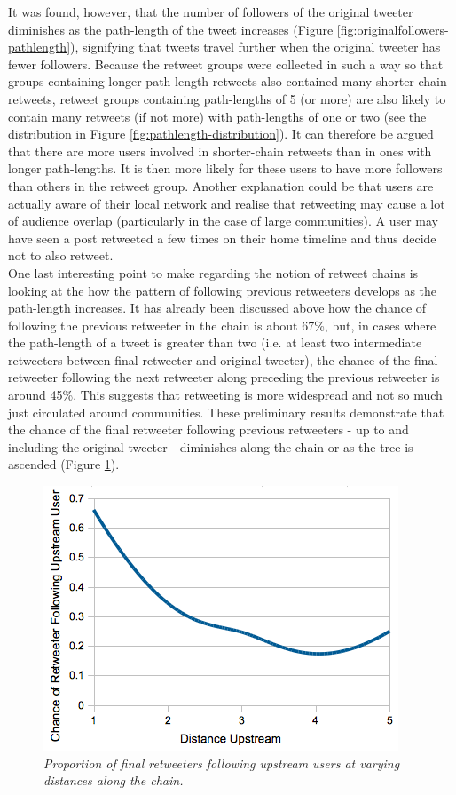 It was found, however, that the number of followers of the original tweeter diminishes as the path-length of the tweet increases (Figure \ref{fig:originalfollowers-pathlength}), signifying that tweets travel further when the original tweeter has fewer followers. Because the retweet groups were collected in such a way so that groups containing longer path-length retweets also contained many shorter-chain retweets, retweet groups containing path-lengths of 5 (or more) are also likely to contain many retweets (if not more) with path-lengths of one or two (see the distribution in Figure \ref{fig:pathlength-distribution}). It can therefore be argued that there are more users involved in shorter-chain retweets than in ones with longer path-lengths. It is then more likely for these users to have more followers than others in the retweet group. Another explanation could be that users are actually aware of their local network and realise that retweeting may cause a lot of audience overlap (particularly in the case of large communities). A user may have seen a post retweeted a few times on their home timeline and thus decide not to also retweet.\\
One last interesting point to make regarding the notion of retweet chains is looking at the how the pattern of following previous retweeters develops as the path-length increases. It has already been discussed above how the chance of following the previous retweeter in the chain is about 67\%, but, in cases where the path-length of a tweet is greater than two (i.e. at least two intermediate retweeters between final retweeter and original tweeter), the chance of the final retweeter following the next retweeter along preceding the previous retweeter is around 45\%. This suggests that retweeting is more widespread and not so much just circulated around communities. These preliminary results demonstrate that the chance of the final retweeter following previous retweeters - up to and including the original tweeter - diminishes along the chain or as the tree is ascended (Figure \ref{fig:following-possibility}).\\
\begin{figure}[h]
\includegraphics[scale=0.55]{3.Chapter1/Media/following-possibility.png} 
\caption{\textit{Proportion of final retweeters following upstream users at varying distances along the chain.}}
\label{fig:following-possibility}
\end{figure}
